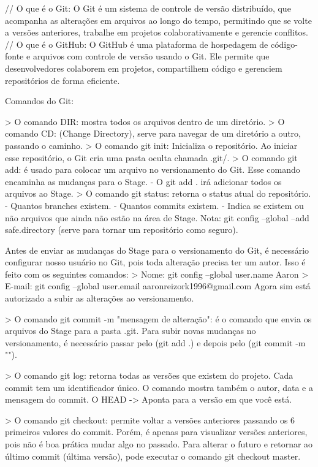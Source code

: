 // O que é o Git:
O Git é um sistema de controle de versão distribuído, que acompanha as alterações em arquivos ao longo do tempo, 
permitindo que se volte a versões anteriores, trabalhe em projetos colaborativamente e gerencie conflitos.
// O que é o GitHub:
O GitHub é uma plataforma de hospedagem de código-fonte e arquivos com controle de versão usando o Git. 
Ele permite que desenvolvedores colaborem em projetos, compartilhem código e gerenciem repositórios de forma eficiente.

Comandos do Git:

> O comando DIR: mostra todos os arquivos dentro de um diretório.
> O comando CD: (Change Directory), serve para navegar de um diretório a outro, passando o caminho.
> O comando git init: Inicializa o repositório. Ao iniciar esse repositório, o Git cria uma pasta oculta chamada .git/.
> O comando git add: é usado para colocar um arquivo no versionamento do Git. Esse comando encaminha as mudanças para o Stage.
    - O git add . irá adicionar todos os arquivos ao Stage.
> O comando git status: retorna o status atual do repositório. 
    - Quantos branches existem.
    - Quantos commits existem.
    - Indica se existem ou não arquivos que ainda não estão na área de Stage.
Nota: git config --global --add safe.directory (serve para tornar um repositório como seguro).

Antes de enviar as mudanças do Stage para o versionamento do Git, é necessário configurar nosso
usuário no Git, pois toda alteração precisa ter um autor. Isso é feito com os seguintes comandos:
> Nome: git config --global user.name Aaron
> E-mail: git config --global user.email aaronreizork1996@gmail.com
Agora sim está autorizado a subir as alterações ao versionamento.

> O comando git commit -m "mensagem de alteração": é o comando que envia os arquivos do Stage para a pasta .git.
Para subir novas mudanças no versionamento, é necessário passar pelo (git add .) e depois pelo (git commit -m "").

> O comando git log: retorna todas as versões que existem do projeto. Cada commit tem um identificador
único. O comando mostra também o autor, data e a mensagem do commit. 
O HEAD -> Aponta para a versão em que você está.

> O comando git checkout: permite voltar a versões anteriores passando os 6 primeiros valores do commit.
Porém, é apenas para visualizar versões anteriores, pois não é boa prática mudar algo no passado. Para alterar o futuro e retornar ao último commit (última versão), pode executar o 
comando git checkout master.

